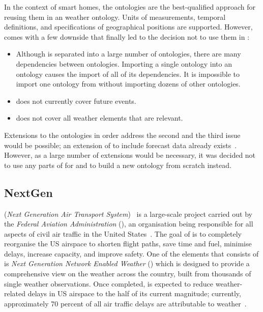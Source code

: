 In the context of smart homes, the  ontologies are the best-qualified approach for reusing them in an weather ontology. Units of measurements, temporal definitions, and specifications of geographical positions are supported. However,  comes with a few downside that finally led to the decision not to use them in \smarthomeweather:
\begin{itemize}
  \item Although  is separated into a large number of ontologies, there are many dependencies between ontologies. Importing a single ontology into an  ontology causes the import of all of its dependencies. It is impossible to import one ontology from  without importing dozens of other ontologies.
  
  \item {} does not currently cover future events.
  
  \item {} does not cover all weather elements that are relevant.
\end{itemize}

Extensions to the  ontologies in order address the second and the third issue would be possible; an extension of  to include forecast data already exists~\cite{sweet_example3}. However, as a large number of extensions would be necessary, it was decided not to use any parts of  for \smarthomeweather and to build a new ontology from scratch instead.

\subsection{NextGen}
\label{subsec:onto4}

 (\emph{Next Generation Air Transport System})~\cite{NextGen} is a large-scale project carried out by the \emph{Federal Aviation Administration} (), an organisation being responsible for all aspects of civil air traffic in the United States~\cite{faa}. The goal of  is to completely reorganise the US airspace to shorten flight paths, save time and fuel, minimise delays, increase capacity, and improve safety. One of the elements that  consists of is \emph{Next Generation Network Enabled Weather} () which is designed to provide a comprehensive view on the weather across the country, built from thousands of single weather observations. Once completed,  is expected to reduce weather-related delays in US airspace to the half of its current magnitude; currently, approximately 70 percent of all air traffic delays are attributable to weather~\cite{nnew}.

